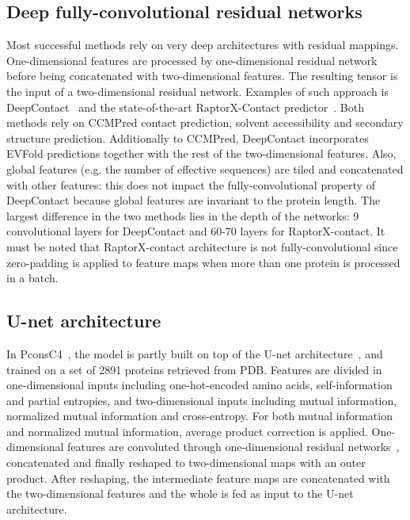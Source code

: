     \subsection{Deep fully-convolutional residual networks}

        Most successful methods rely on very deep architectures with residual mappings.
        One-dimensional features are processed by one-dimensional residual network
        before being concatenated with two-dimensional features. The resulting tensor
        is the input of a two-dimensional residual network.
        Examples of such approach is DeepContact~\cite{DeepContact} and the state-of-the-art
        RaptorX-Contact predictor~\cite{RaptorX}. Both methods rely on CCMPred contact
        prediction, solvent accessibility and secondary structure prediction.
        Additionally to CCMPred, DeepContact incorporates EVFold predictions together
        with the rest of the two-dimensional features. Also, global features (e.g. the number
        of effective sequences) are tiled and concatenated with other features: this does
        not impact the fully-convolutional property of DeepContact because global features
        are invariant to the protein length.
        The largest difference in the two methods lies in the depth of the networks:
        9 convolutional layers for DeepContact and 60-70 layers for RaptorX-contact.
        It must be noted that RaptorX-contact architecture is not fully-convolutional
        since zero-padding is applied to feature maps when more than one protein
        is processed in a batch.

    \subsection{U-net architecture}

        In PconsC4~\cite{Michel383133}, the model is partly built on top of the U-net
        architecture~\cite{DBLP:journals/corr/RonnebergerFB15}, and trained on a set
        of 2891 proteins retrieved from PDB. Features are divided in one-dimensional
        inputs including one-hot-encoded amino acids, self-information and
        partial entropies, and two-dimensional inputs including mutual information,
        normalized mutual information and cross-entropy.
        For both mutual information and normalized mutual information,
        average product correction is applied.
        One-dimensional features are convoluted through one-dimensional residual networks~,
        concatenated and finally reshaped to two-dimensional maps with an outer product.
        After reshaping, the intermediate feature maps are concatenated with the
        two-dimensional features and the whole is fed as input to the U-net architecture.

